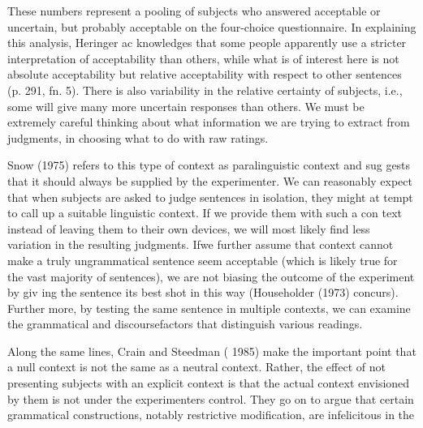 \setcounter{listWWNumxxxiileveli}{5}
\begin{listWWNumxxxiileveli}
\item 
\begin{styleStandard}
These numbers represent a pooling of subjects who answered {\textquotedbl}acceptable{\textquotedbl} or {\textquotedbl}uncertain, but probably acceptable{\textquotedbl} on the four-choice questionnaire. In explaining this analysis, Heringer ac\- knowledges that {\textquotedbl}some people apparently use a stricter interpretation of acceptability than others, while what is of interest here is not absolute acceptability but relative acceptability with respect to other sentences{\textquotedbl} (p. 291, fn. 5). There is also variability in the relative certainty of subjects, i.e., some will give many more {\textquotedbl}uncertain{\textquotedbl} responses than others. We must be extremely careful thinking about what information we are trying to extract from judgments, in choosing what to do with raw ratings.
\end{styleStandard}


\end{listWWNumxxxiileveli}
\clearpage\setcounter{page}{1}\begin{styleTextbody}
Snow (1975) refers to this type of context as paralinguistic context and sug\- gests that it should always be supplied by the experimenter. We can reasonably expect that when subjects are asked to judge sentences in isolation, they might at\- tempt to call up a suitable linguistic context. If we provide them with such a con\- text instead of leaving them to their own devices, we will most likely find less variation in the resulting judgments. Ifwe further assume that context cannot make a truly ungrammatical sentence seem acceptable (which is likely true for the vast majority of sentences), we are not biasing the outcome of the experiment by giv\- ing the sentence its best shot in this way (Householder (1973) concurs). Further\- more, by testing the same sentence in multiple contexts, we can examine the grammatical and discoursefactors that distinguish various readings.
\end{styleTextbody}


\begin{styleTextbody}
Along the same lines, Crain and Steedman ( 1985) make the important point that a null context is not the same as a neutral context. Rather, the effect of not presenting subjects with an explicit context is that the actual context envisioned by them is not under the experimenter{\textquotesingle}s control. They go on to argue that certain grammatical constructions, notably restrictive modification, are infelicitous in the
\end{styleTextbody}


